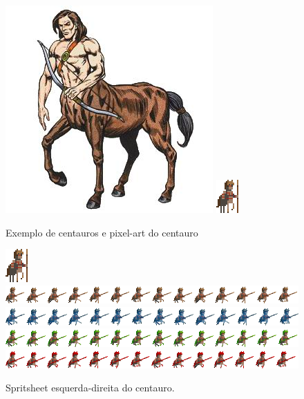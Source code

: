 \documentclass[11pt]{article} %
\begin{document}
\begin{figure}[!htp]
\centering
\includegraphics[scale=0.4]{res/characters/centauro.jpg} \quad
\includegraphics[scale=3]{res/characters/centauro.png} 
\caption{Exemplo de centauros e pixel-art do centauro}
\label{cyclops}
\end{figure}

\begin{figure}[!htp]
\centering
\advance\leftskip-3cm
\advance\rightskip-3cm
\includegraphics[scale=2]{res/units/centauro/centauro.png} \quad
\includegraphics[scale=0.7]{res/units/centauro/centaurosheet.png} \quad
\includegraphics[scale=0.7]{res/units/centauro/centaurosheet_congelado.png} \quad
\includegraphics[scale=0.7]{res/units/centauro/centaurosheet_verde.png} \quad
\includegraphics[scale=0.7]{res/units/centauro/centaurosheet_vermelho.png} 
\caption{Spritsheet esquerda-direita do centauro.}
\label{centaurosheet}
\end{figure}
\end{document}
